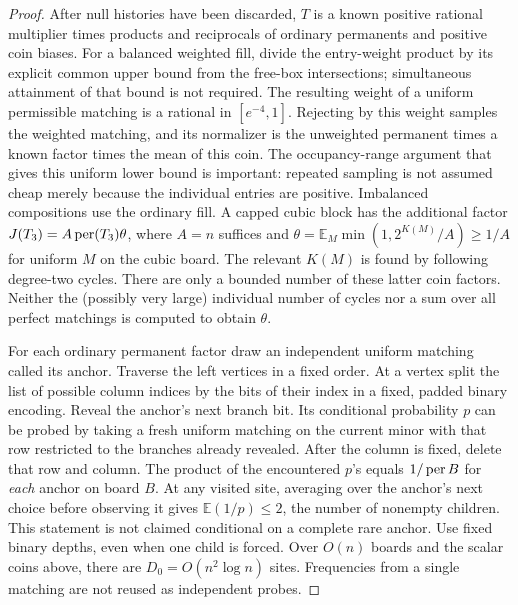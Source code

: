 \begin{proof}
After null histories have been discarded, $T$ is a known positive
rational multiplier times products and reciprocals of ordinary
permanents and positive coin biases. For a balanced weighted fill,
divide the entry-weight product by its explicit common upper
bound from the free-box intersections; simultaneous attainment of that
bound is not required. The resulting weight of a
uniform permissible matching is a rational in $[e^{-4},1]$.
Rejecting by this weight samples the weighted matching, and its
normalizer is the unweighted permanent times a known factor times
the mean of this coin. The occupancy-range argument that gives this
uniform lower bound is important: repeated sampling is not assumed
cheap merely because the individual entries are positive. Imbalanced
compositions use the ordinary fill. A capped cubic block has the
additional factor $J(T_3)=A\operatorname{per}(T_3)\theta$, where $A=n$ suffices and
$\theta=\mathbb E_M\min(1,2^{K(M)}/A)\ge1/A$ for uniform $M$ on
the cubic board. The relevant $K(M)$ is found by following degree-two
cycles. There are only a bounded number of these latter coin factors.
Neither the (possibly very large) individual number of cycles nor a
sum over all perfect matchings is computed to obtain $\theta$.

For each ordinary permanent factor draw an independent uniform
matching called its anchor. Traverse the left vertices in a fixed
order. At a vertex split the list of possible column indices by the
bits of their index in a fixed, padded binary encoding. Reveal the
anchor's next branch bit. Its conditional probability $p$ can be
probed by taking a fresh uniform matching on the current minor with
that row restricted to the branches already revealed. After the
column is fixed, delete that row and column. The product of the
encountered $p$'s equals $1/\operatorname{per} B$ for \emph{each} anchor on board
$B$. At any visited site, averaging over the anchor's next choice
before observing it gives $\mathbb E(1/p)\le2$, the number of
nonempty children. This statement is not claimed conditional on a
complete rare anchor. Use fixed binary depths, even when one child is
forced. Over $O(n)$ boards and the scalar coins above, there are
$D_0=O(n^2\log n)$ sites. Frequencies from a single matching are not
reused as independent probes.


\end{proof}
